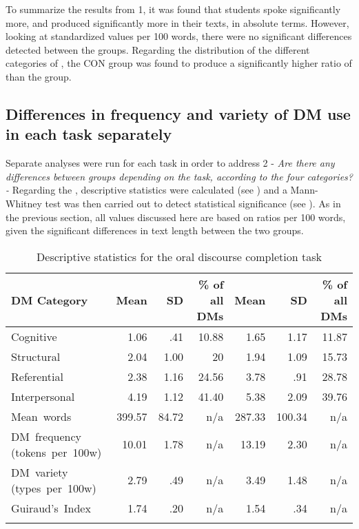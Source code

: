 \documentclass[output=paper]{langsci/langscibook}
\begin{document}
To summarize the results from  1, it was found that  students spoke significantly more, and produced significantly more  in their texts, in absolute terms. However, looking at standardized values per 100 words, there were no significant differences detected between the groups. Regarding the distribution of the different categories of , the CON group was found to produce a significantly higher ratio of   than the  group.



\subsection{Differences in frequency and variety of DM use in each task separately}


Separate analyses were run for each task in order to address  2 - \textit{Are there any differences between groups depending on the task, according to the four categories?-} Regarding the , descriptive statistics were calculated (see ) and a Mann-Whitney test was then carried out to detect statistical significance (see ). As in the previous section, all values discussed here are based on ratios per 100 words, given the significant differences in text length between the two groups. 





\begin{table}[t]
\caption{\label{tab:ament:9} Descriptive statistics for the oral discourse completion task}
\begin{tabularx}{\textwidth}{Q rr@{~}r rr@{~}r}
\lsptoprule
\bfseries DM Category & \bfseries {Mean} & \bfseries {SD} & \bfseries {\% of all DMs} & \bfseries {Mean} & \bfseries {SD} & \bfseries {\% of all DMs}\\
\midrule 
{Cognitive} & 1.06 & .41 & 10.88 & 1.65 & 1.17 & 11.87\\
{Structural} & 2.04 & 1.00 & 20 & 1.94 & 1.09 & 15.73\\
{Referential} & 2.38 & 1.16 & 24.56 & 3.78 & .91 & 28.78\\
{Interpersonal} & 4.19 & 1.12 & 41.40 & 5.38 & 2.09 & 39.76\\
{Mean~words} & 399.57 & 84.72 & n/a & 287.33 & 100.34 & n/a\\
\mbox{DM~frequency} \mbox{(tokens per 100w)}    & 10.01 & 1.78 & n/a & 13.19 & 2.30 & n/a\\
\mbox{DM~variety} \mbox{(types per 100w)}    & 2.79 & .49 & n/a & 3.49 & 1.48 & n/a\\
\mbox{Guiraud’s Index} & 1.74 & .20 & n/a & 1.54 & .34 & n/a\\
\lspbottomrule
\end{tabularx}
\end{table}
\end{document}
